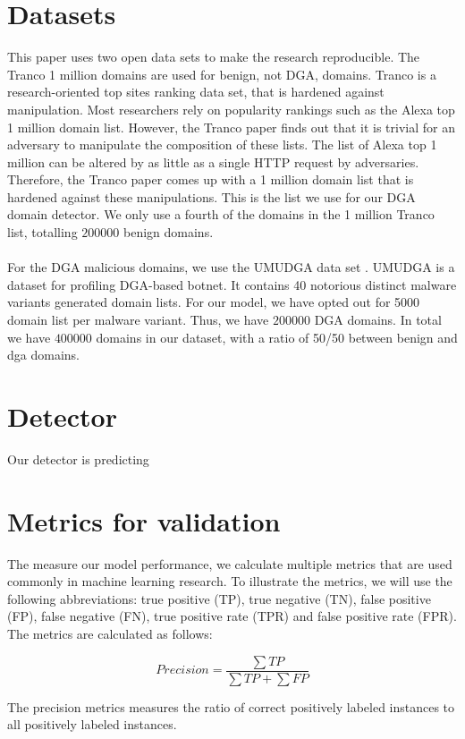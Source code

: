 \section{Datasets}
This paper uses two open data sets to make the research reproducible. The Tranco 1 million domains \cite{Tranco} are used for benign, not DGA, domains. Tranco is a research-oriented top sites ranking data set, that is hardened against manipulation. Most researchers \cite{Antonakakis}\cite{Lison}\cite{Highnam}\cite{TRAN20182401} rely on popularity rankings such as the Alexa top 1 million domain list. However, the Tranco paper \cite{Tranco} finds out that it is trivial for an adversary to manipulate the composition of these lists. The list of Alexa top 1 million can be altered by as little as a single HTTP request by adversaries. Therefore, the Tranco paper comes up with a 1 million domain list that is hardened against these manipulations. This is the list we use for our DGA domain detector. We only use a fourth of the domains in the 1 million Tranco list, totalling $200000$ benign domains.\\\\
For the DGA malicious domains, we use the UMUDGA data set \cite{UMUDGA}. UMUDGA is a dataset for profiling DGA-based botnet. It contains 40 notorious distinct malware variants generated domain lists. For our model, we have opted out for 5000 domain list per malware variant. Thus, we have $200000$ DGA domains. In total we have $400000$ domains in our dataset, with a ratio of 50/50 between benign and dga domains.

\section{Detector}
Our detector is predicting

\section{Metrics for validation}
The measure our model performance, we calculate multiple metrics that are used commonly in machine learning research. To illustrate the metrics, we will use the following abbreviations: true positive (TP), true negative (TN), false positive (FP), false negative (FN), true positive rate (TPR) and false positive rate (FPR). The metrics are calculated as follows:

$${
            Precision = \frac{\sum TP}{\sum TP + \sum FP}
        }
$$

The precision metrics measures the ratio of correct positively labeled instances to all positively labeled instances.

